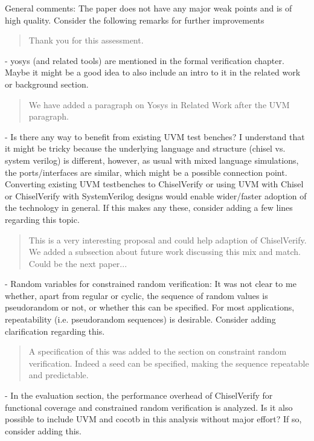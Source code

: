 \documentclass{article}
\newcommand{\reply}[1]{{\color{blue} #1}}
\begin{document}
General comments:
The paper does not have any major weak points and is of high quality. Consider the following remarks for further improvements

\begin{quote}
\reply{Thank you for this assessment.}
\end{quote}

- yosys (and related tools) are mentioned in the formal verification chapter. Maybe it might be a good idea to also include an intro to it in the related work or background section.

\begin{quote}
\reply{We have added a paragraph on Yosys in Related Work after the UVM paragraph.}
\end{quote}

- Is there any way to benefit from existing UVM test benches? I understand that it might be tricky because the underlying language and structure (chisel vs. system verilog) is different, however, as usual with mixed language simulations, the ports/interfaces are similar, which might be a possible connection point. Converting existing UVM testbenches to ChiselVerify or using UVM with Chisel or ChiselVerify with SystemVerilog designs would enable wider/faster adoption of the technology in general. If this makes any these, consider adding a few lines regarding this topic.

\begin{quote}
\reply{This is a very interesting proposal and could help adaption of ChiselVerify. We added a subsection about future work
discussing this mix and match. Could be the next paper...}
\end{quote}


- Random variables for constrained random verification: It was not clear to me whether, apart from regular or cyclic, the sequence of random values is pseudorandom or not, or whether this can be specified. For most applications, repeatability (i.e. pseudorandom sequences) is desirable. Consider adding clarification regarding this.

\begin{quote}
\reply{A specification of this was added to the section on constraint random verification. Indeed a seed can be specified, making the sequence repeatable and predictable.}
\end{quote}

- In the evaluation section, the performance overhead of ChiselVerify for functional coverage and constrained random verification is analyzed. Is it also possible to include UVM and cocotb in this analysis without major effort? If so, consider adding this.
\end{document}
